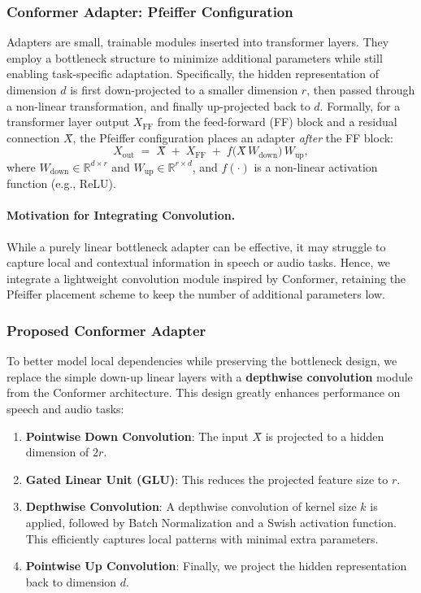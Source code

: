 \documentclass[11pt]{article}
\begin{document}
\subsubsection{Conformer Adapter: Pfeiffer Configuration}
Adapters are small, trainable modules inserted into transformer layers. They employ a bottleneck structure to minimize additional parameters while still enabling task-specific adaptation. Specifically, the hidden representation of dimension $d$ is first down-projected to a smaller dimension $r$, then passed through a non-linear transformation, and finally up-projected back to $d$. Formally, for a transformer layer output $X_{\text{FF}}$ from the feed-forward (FF) block and a residual connection $X̂$, the Pfeiffer configuration places an adapter \emph{after} the FF block:
\begin{equation}
X_{\text{out}} \;=\; X̂ \;+\; X_{\text{FF}} \;+\; f\bigl(X̂\,W_{\text{down}}\bigr)\,W_{\text{up}},
\end{equation}
where $W_{\text{down}} \in \mathbb{R}^{d \times r}$ and $W_{\text{up}} \in \mathbb{R}^{r \times d}$, and $f(\cdot)$ is a non-linear activation function (e.g., ReLU). 

\paragraph{Motivation for Integrating Convolution.}
While a purely linear bottleneck adapter can be effective, it may struggle to capture local and contextual information in speech or audio tasks. Hence, we integrate a lightweight convolution module inspired by Conformer, retaining the Pfeiffer placement scheme to keep the number of additional parameters low.

\subsubsection{Proposed Conformer Adapter}
To better model local dependencies while preserving the bottleneck design, we replace the simple down-up linear layers with a \textbf{depthwise convolution} module from the Conformer architecture. This design greatly enhances performance on speech and audio tasks:

\begin{enumerate}
    \item \textbf{Pointwise Down Convolution}: The input $X̂$ is projected to a hidden dimension of $2r$. 
    \item \textbf{Gated Linear Unit (GLU)}: This reduces the projected feature size to $r$.
    \item \textbf{Depthwise Convolution}: A depthwise convolution of kernel size $k$ is applied, followed by Batch Normalization and a Swish activation function. This efficiently captures local patterns with minimal extra parameters.
    \item \textbf{Pointwise Up Convolution}: Finally, we project the hidden representation back to dimension $d$.
\end{enumerate}
\end{document}
